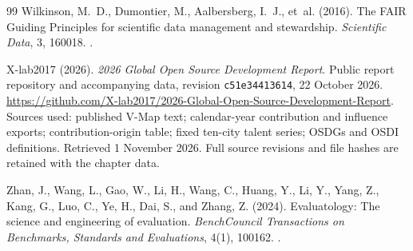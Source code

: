 \begin{thebibliography}{99}
Wilkinson, M.~D., Dumontier, M., Aalbersberg, I.~J., et~al. (2016).
The FAIR Guiding Principles for scientific data management and stewardship.
\emph{Scientific Data}, 3, 160018.
.

X-lab2017 (2026).
\emph{2026 Global Open Source Development Report}.
Public report repository and accompanying data, revision \texttt{c51e34413614}, 22 October 2026.
\url{https://github.com/X-lab2017/2026-Global-Open-Source-Development-Report}.
Sources used: published V-Map text; calendar-year contribution and influence exports; contribution-origin table; fixed ten-city talent series; OSDGs and OSDI definitions. Retrieved 1 November 2026. Full source revisions and file hashes are retained with the chapter data.

Zhan, J., Wang, L., Gao, W., Li, H., Wang, C., Huang, Y., Li, Y., Yang, Z., Kang, G., Luo, C., Ye, H., Dai, S., and Zhang, Z. (2024).
Evaluatology: The science and engineering of evaluation.
\emph{BenchCouncil Transactions on Benchmarks, Standards and Evaluations}, 4(1), 100162.
.
\end{thebibliography}
\endgroup
